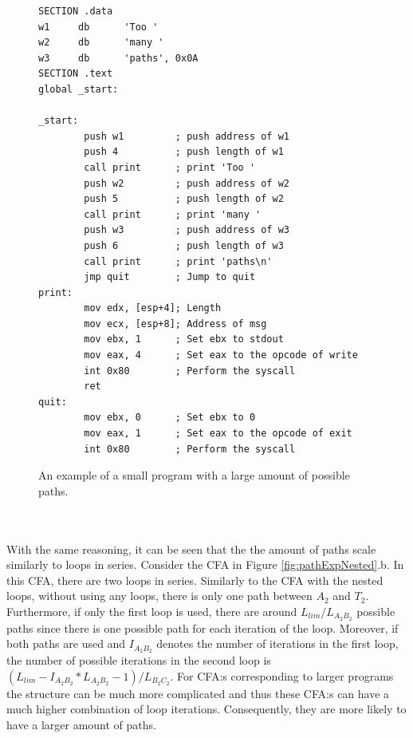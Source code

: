 \documentclass{kththesis}
\begin{document}
\begin{figure}[!t]
    \centering
\begin{tcolorbox}
\begin{verbatim}
SECTION .data
w1     db      'Too '
w2     db      'many '
w3     db      'paths', 0x0A
SECTION .text
global _start:

_start:
        push w1         ; push address of w1
        push 4          ; push length of w1
        call print      ; print 'Too '
        push w2         ; push address of w2
        push 5          ; push length of w2
        call print      ; print 'many '
        push w3         ; push address of w3
        push 6          ; push length of w3
        call print      ; print 'paths\n'
        jmp quit        ; Jump to quit
print:
        mov edx, [esp+4]; Length
        mov ecx, [esp+8]; Address of msg
        mov ebx, 1      ; Set ebx to stdout
        mov eax, 4      ; Set eax to the opcode of write
        int 0x80        ; Perform the syscall
        ret
quit:
        mov ebx, 0      ; Set ebx to 0
        mov eax, 1      ; Set eax to the opcode of exit
        int 0x80        ; Perform the syscall
\end{verbatim}
\end{tcolorbox}
\caption{An example of a small program with a large amount of possible paths.}
    \label{fig:pathExpProg}
\end{figure}
\\ \\
With the same reasoning, it can be seen that the the amount of paths scale similarly to loops in series. Consider the CFA in Figure \ref{fig:pathExpNested}.b. In this CFA, there are two loops in series. Similarly to the CFA with the nested loops, without using any loops, there is only one path between $A_2$ and $T_2$. Furthermore, if only the first loop is used, there are around $L_{lim}/L_{A_2B_2}$ possible paths since there is one possible path for each iteration of the loop. Moreover, if both paths are used and $I_{A_2B_2}$ denotes the number of iterations in the first loop, the number of possible iterations in the second loop is $(L_{lim}-I_{A_2B_2}*L_{A_2B_2}-1)/L_{B_2C_2}$. For CFA:s corresponding to larger programs the structure can be much more complicated and thus these CFA:s can have a much higher combination of loop iterations. Consequently, they are more likely to have a larger amount of paths.
\end{document}

